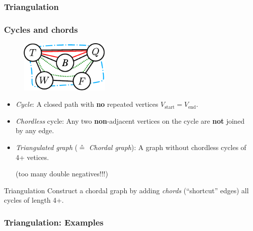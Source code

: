 \clearpage

\subsubsection{Triangulation}

\begin{frame}\frametitle{Cycles and chords}

\slidesonly{\vspace{-3mm}}

\begin{figure}[h]
\centering
	\includegraphics[height=2.5cm]{img/cycles2}
\end{figure}

\slidesonly{\vspace{-2mm}}

\begin{itemize}
\item \emph{Cycle}: A closed path with \textbf{no} repeated vertices  $V_{\text{start}}=V_{\text{end}}$.
\item \emph{Chordless} cycle: Any two \textbf{non}-adjacent vertices on the cycle are \textbf{not} joined by any edge.
\item \emph{Triangulated graph} ($\corresponds$ \emph{Chordal graph}): A graph without chordless cycles of 4+ vetices.
\begin{flushright}
{\footnotesize(too many double negatives!!!)}
\end{flushright}
\end{itemize}

\begin{block}{Triangulation}
Construct a chordal graph by adding \emph{chords} (``shortcut'' edges) all cycles of length 4+.
\end{block} 

\end{frame}


\newpage

\subsubsection{Triangulation: Examples}


